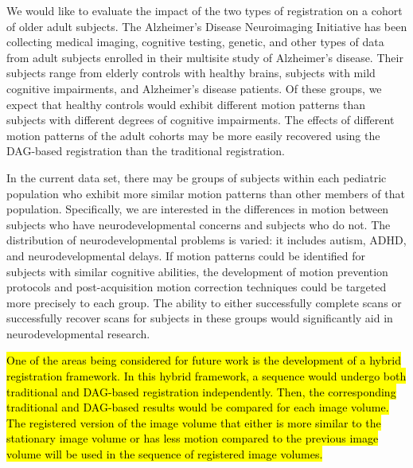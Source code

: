 We would like to evaluate the impact of the two types of registration on a cohort of older adult subjects. The Alzheimer's Disease Neuroimaging Initiative has been collecting medical imaging, cognitive testing, genetic, and other types of data from adult subjects enrolled in their multisite study of Alzheimer's disease. Their subjects range from elderly controls with healthy brains, subjects with mild cognitive impairments, and Alzheimer's disease patients. Of these groups, we expect that healthy controls would exhibit different motion patterns than subjects with different degrees of cognitive impairments. The effects of different motion patterns of the adult cohorts may be more easily recovered using the DAG-based registration than the traditional registration.

In the current data set, there may be groups of subjects within each pediatric population who exhibit more similar motion patterns than other members of that population. Specifically, we are interested in the differences in motion between subjects who have neurodevelopmental concerns and subjects who do not. The distribution of neurodevelopmental problems is varied: it includes autism, ADHD, and neurodevelopmental delays. If motion patterns could be identified for subjects with similar cognitive abilities, the development of motion prevention protocols and post-acquisition motion correction techniques could be targeted more precisely to each group. The ability to either successfully complete scans or successfully recover scans for subjects in these groups would significantly aid in neurodevelopmental research.

\hl{One of the areas being considered for future work is the development of a hybrid registration framework. In this hybrid framework, a sequence would undergo both traditional and DAG-based registration independently. Then, the corresponding traditional and DAG-based results would be compared for each image volume. The registered version of the image volume that either is more similar to the stationary image volume or has less motion compared to the previous image volume will be used in the sequence of registered image volumes.}
